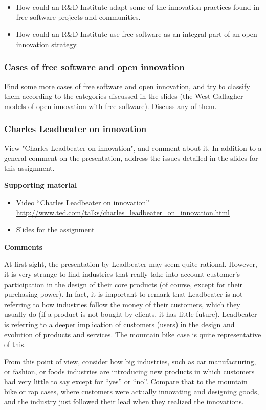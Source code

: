 \documentclass[a4paper]{article}
\begin{document}
\begin{itemize}
\item How could an R\&D Institute adapt some of the innovation practices found in free software projects and communities.
\item How could an R\&D Institute use free software as an integral part of an open innovation strategy.
\end{itemize}


\subsubsection{Cases of free software and open innovation}
\label{sub:openinnova-cases}

Find some more cases of free software and open innovation, and try to classify them according to the categories discussed in the slides (the West-Gallagher models of open innovation with free software). Discuss any of them.


\subsubsection{Charles Leadbeater on innovation}
\label{sub:openinnova-leadbater}

View "Charles Leadbeater on innovation", and comment about it. In addition to a general comment on the presentation, address the issues detailed in the slides for this assignment.

\textbf{Supporting material}

\begin{itemize}
\item Video ``Charles Leadbeater on innovation'' \\
  \url{http://www.ted.com/talks/charles_leadbeater_on_innovation.html}
\item Slides for the assignment
\end{itemize}

\textbf{Comments}

At first sight, the presentation by Leadbeater may seem quite rational. However, it is very strange to find industries that really take into account customer's participation in the design of their core products (of course, except for their purchasing power). In fact, it is important to remark that Leadbeater is not referring to how industries follow the money of their customers, which they usually do (if a product is not bought by clients, it has little future). Leadbeater is referring to a deeper implication of customers (users) in the design and evolution of products and services. The mountain bike case is quite representative of this.

From this point of view, consider how big industries, such as car manufacturing, or fashion, or foods industries are introducing new products in which customers had very little to say except for ``yes'' or ``no''. Compare that to the mountain bike or rap cases, where customers were actually innovating and designing goods, and the industry just followed their lead when they realized the innovations.
\end{document}
